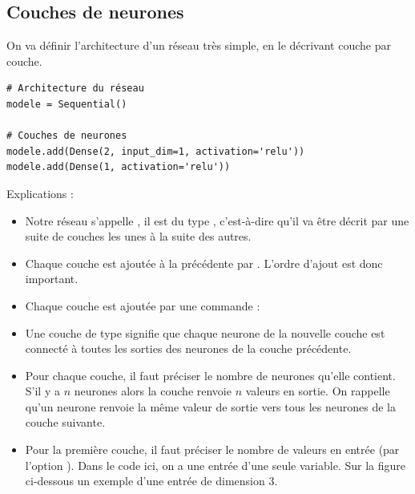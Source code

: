 \documentclass[11pt,class=report,crop=false]{standalone}
\begin{document}
\subsection{Couches de neurones}
\label{ssec:couches}

On va définir l'architecture d'un réseau très simple, en le décrivant couche par couche.
\begin{lstlisting}
# Architecture du réseau
modele = Sequential()

# Couches de neurones
modele.add(Dense(2, input_dim=1, activation='relu'))
modele.add(Dense(1, activation='relu'))
\end{lstlisting} 

Explications :
\begin{itemize}
  \item Notre réseau s'appelle , il est du type , c'est-à-dire qu'il va être décrit par une suite de couches les unes à la suite des autres.
  
  \item Chaque couche est ajoutée à la précédente par .
  L'ordre d'ajout est donc important.
  
  \item Chaque couche est ajoutée par une commande :
  
  \item Une couche de type  signifie que chaque neurone de la nouvelle couche est connecté à toutes les sorties des neurones de la couche précédente.
  
 
  
  \item Pour chaque couche, il faut préciser le nombre de neurones qu'elle contient. S'il y a $n$ neurones alors la couche renvoie $n$ valeurs en sortie. On rappelle qu'un neurone renvoie la même valeur de sortie vers tous les neurones de la couche suivante.
  
  \item Pour la première couche, il faut préciser le nombre de valeurs en entrée (par l'option ). Dans le code ici, on a une entrée d'une seule variable. Sur la figure ci-dessous un exemple d'une entrée de dimension $3$.


\end{itemize}
\end{document}
